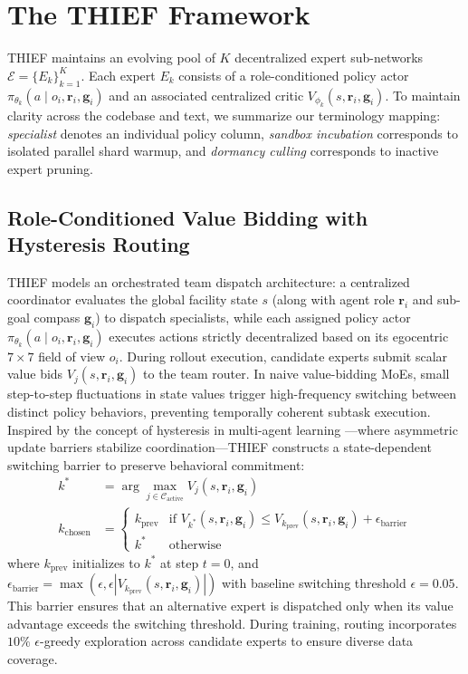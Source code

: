 \section{The THIEF Framework}
\label{sec:thief}

THIEF maintains an evolving pool of $K$ decentralized expert sub-networks $\mathcal{E} = \{E_k\}_{k=1}^K$. Each expert $E_k$ consists of a role-conditioned policy actor $\pi_{\theta_k}(a \mid o_i, \mathbf{r}_i, \mathbf{g}_i)$ and an associated centralized critic $V_{\phi_k}(s, \mathbf{r}_i, \mathbf{g}_i)$. To maintain clarity across the codebase and text, we summarize our terminology mapping: \emph{specialist} denotes an individual policy column, \emph{sandbox incubation} corresponds to isolated parallel shard warmup, and \emph{dormancy culling} corresponds to inactive expert pruning.

\subsection{Role-Conditioned Value Bidding with Hysteresis Routing}
THIEF models an orchestrated team dispatch architecture: a centralized coordinator evaluates the global facility state $s$ (along with agent role $\mathbf{r}_i$ and sub-goal compass $\mathbf{g}_i$) to dispatch specialists, while each assigned policy actor $\pi_{\theta_k}(a \mid o_i, \mathbf{r}_i, \mathbf{g}_i)$ executes actions strictly decentralized based on its egocentric $7 \times 7$ field of view $o_i$. During rollout execution, candidate experts submit scalar value bids $V_j(s, \mathbf{r}_i, \mathbf{g}_i)$ to the team router. In naive value-bidding MoEs, small step-to-step fluctuations in state values trigger high-frequency switching between distinct policy behaviors, preventing temporally coherent subtask execution. Inspired by the concept of hysteresis in multi-agent learning \citep{matignon2007hysteretic}---where asymmetric update barriers stabilize coordination---THIEF constructs a state-dependent switching barrier to preserve behavioral commitment:
\begin{align}
k^* &= \arg\max_{j \in \mathcal{C}_{\text{active}}} V_j(s, \mathbf{r}_i, \mathbf{g}_i) \\
k_{\text{chosen}} &= 
\begin{cases}
k_{\text{prev}} & \text{if } V_{k^*}(s, \mathbf{r}_i, \mathbf{g}_i) \le V_{k_{\text{prev}}}(s, \mathbf{r}_i, \mathbf{g}_i) + \epsilon_{\text{barrier}} \\
k^* & \text{otherwise}
\end{cases}
\end{align}
where $k_{\text{prev}}$ initializes to $k^*$ at step $t=0$, and $\epsilon_{\text{barrier}} = \max(\epsilon, \epsilon |V_{k_{\text{prev}}}(s, \mathbf{r}_i, \mathbf{g}_i)|)$ with baseline switching threshold $\epsilon = 0.05$. This barrier ensures that an alternative expert is dispatched only when its value advantage exceeds the switching threshold. During training, routing incorporates $10\%$ $\epsilon$-greedy exploration across candidate experts to ensure diverse data coverage.

